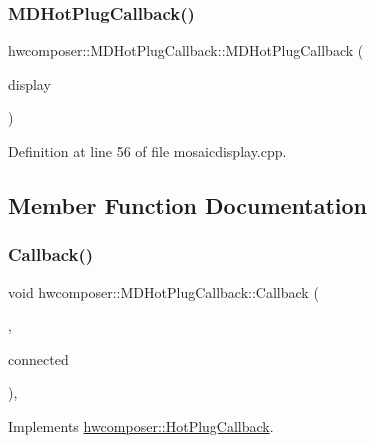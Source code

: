 \subsubsection{\texorpdfstring{M\+D\+Hot\+Plug\+Callback()}{MDHotPlugCallback()}}
{\footnotesize\ttfamily hwcomposer\+::\+M\+D\+Hot\+Plug\+Callback\+::\+M\+D\+Hot\+Plug\+Callback (\begin{DoxyParamCaption}\item[{\mbox{\hyperlink{classhwcomposer_1_1MosaicDisplay}{Mosaic\+Display}} $\ast$}]{display }\end{DoxyParamCaption})\hspace{0.3cm}{\ttfamily [inline]}}



Definition at line 56 of file mosaicdisplay.\+cpp.


\begin{DoxyCode}{0}
\end{DoxyCode}


\subsection{Member Function Documentation}
\mbox{\label{classhwcomposer_1_1MDHotPlugCallback_a56a4bfc5b98f35a0c27aa97afb119a7a}} 
\subsubsection{\texorpdfstring{Callback()}{Callback()}}
{\footnotesize\ttfamily void hwcomposer\+::\+M\+D\+Hot\+Plug\+Callback\+::\+Callback (\begin{DoxyParamCaption}\item[{uint32\+\_\+t}]{,  }\item[{bool}]{connected }\end{DoxyParamCaption})\hspace{0.3cm}{\ttfamily [inline]}, {\ttfamily [virtual]}}



Implements \mbox{\hyperlink{classhwcomposer_1_1HotPlugCallback_a455c8913e1da9b165134a05c9cb441ba}{hwcomposer\+::\+Hot\+Plug\+Callback}}.



